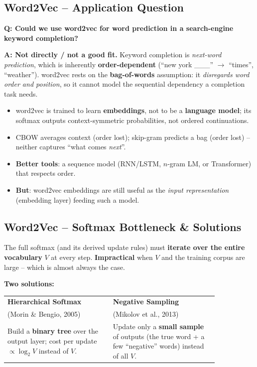 \documentclass[10pt,a4paper]{article}
\begin{document}
	\subsection{Word2Vec -- Application Question}

	\begin{examtipbox}
		\textbf{Q: Could we use word2vec for word prediction in a search-engine keyword completion?}

		\textbf{A: Not directly / not a good fit.} Keyword completion is \emph{next-word prediction}, which is inherently \textbf{order-dependent} (``new york \_\_\_'' $\to$ ``times'', ``weather''). word2vec rests on the \textbf{bag-of-words} assumption: it \emph{disregards word order and position}, so it cannot model the sequential dependency a completion task needs.
		\begin{itemize}[leftmargin=1.2em, nosep]
			\item word2vec is trained to learn \textbf{embeddings}, not to be a \textbf{language model}; its softmax outputs context-symmetric probabilities, not ordered continuations.
			\item CBOW averages context (order lost); skip-gram predicts a bag (order lost) -- neither captures ``what comes \emph{next}''.
			\item \textbf{Better tools}: a sequence model (RNN/LSTM, $n$-gram LM, or Transformer) that respects order.
			\item \textbf{But}: word2vec embeddings are still useful as the \emph{input representation} (embedding layer) feeding such a model.
		\end{itemize}
	\end{examtipbox}

	\subsection{Word2Vec -- Softmax Bottleneck \& Solutions}

	\begin{importantbox}
		The full softmax (and its derived update rules) must \textbf{iterate over the entire vocabulary} $V$ at every step. \textbf{Impractical} when $V$ and the training corpus are large -- which is almost always the case.
	\end{importantbox}

	\textbf{Two solutions:}
	\begin{center}
	\begin{tabular}{p{0.42\linewidth} p{0.42\linewidth}}
		\toprule
		\textbf{Hierarchical Softmax} & \textbf{Negative Sampling} \\
		(Morin \& Bengio, 2005) & (Mikolov et al., 2013) \\
		\midrule
		Build a \textbf{binary tree} over the output layer; cost per update $\propto \log_2 V$ instead of $V$. &
		Update only a \textbf{small sample} of outputs (the true word + a few ``negative'' words) instead of all $V$. \\
		\bottomrule
	\end{tabular}
	\end{center}
\end{document}

